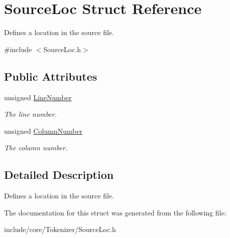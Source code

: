 \hypertarget{struct_source_loc}{}\section{Source\+Loc Struct Reference}
\label{struct_source_loc}


Defines a location in the source file.  




{\ttfamily \#include $<$Source\+Loc.\+h$>$}

\subsection*{Public Attributes}
\begin{DoxyCompactItemize}
\item 
\mbox{\label{struct_source_loc_a3fdf5f2f14d038dc02cbeb497e1d6980}} 
unsigned \mbox{\hyperlink{struct_source_loc_a3fdf5f2f14d038dc02cbeb497e1d6980}{Line\+Number}}
\begin{DoxyCompactList}\small\item\em The line number. \end{DoxyCompactList}\item 
\mbox{\label{struct_source_loc_ae3e47c3115911cf15747d71a49d3654f}} 
unsigned \mbox{\hyperlink{struct_source_loc_ae3e47c3115911cf15747d71a49d3654f}{Column\+Number}}
\begin{DoxyCompactList}\small\item\em The column number. \end{DoxyCompactList}\end{DoxyCompactItemize}


\subsection{Detailed Description}
Defines a location in the source file. 

The documentation for this struct was generated from the following file\+:\begin{DoxyCompactItemize}
\item 
include/core/\+Tokenizer/Source\+Loc.\+h\end{DoxyCompactItemize}
